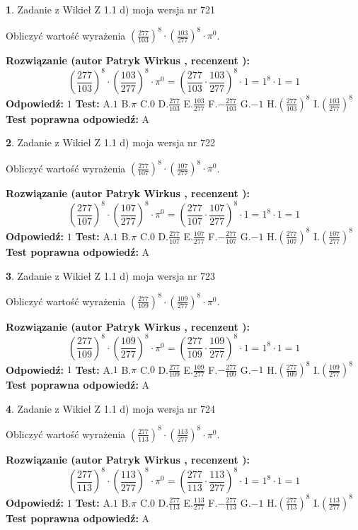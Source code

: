 \documentclass[12pt, a4paper]{article}
\theoremstyle{definition} %
\newtheorem{zad}{}
\newcommand{\zadStart}[1]{\begin{zad}#1\newline}
\newcommand{\zadStop}{\end{zad}}
\newcommand{\rozwStart}[2]{\noindent \textbf{Rozwiązanie (autor #1 , recenzent #2): }\newline}
\newcommand{\rozwStop}{\newline}
\newcommand{\odpStart}{\noindent \textbf{Odpowiedź:}\newline}
\newcommand{\odpStop}{\newline}
\newcommand{\testStart}{\noindent \textbf{Test:}\newline}
\newcommand{\testStop}{\newline}
\newcommand{\kluczStart}{\noindent \textbf{Test poprawna odpowiedź:}\newline}
\newcommand{\kluczStop}{\newline}
\begin{document}
\zadStart{Zadanie z Wikieł Z 1.1 d) moja wersja nr 721}

Obliczyć wartość wyrażenia $(\frac{277}{103})^{8} \cdot (\frac{103}{277})^{8} \cdot \pi^{0}$.
\zadStop
\rozwStart{Patryk Wirkus}{}
$$(\frac{277}{103})^{8} \cdot (\frac{103}{277})^{8} \cdot \pi^{0} = (\frac{277}{103} \cdot \frac{103}{277})^{8} \cdot 1 = 1^{8} \cdot 1 = 1$$
\rozwStop
\odpStart
$1$
\odpStop
\testStart
A.$1$ B.$\pi$ C.$0$ D.$\frac{277}{103}$ E.$\frac{103}{277}$
F.$-\frac{277}{103}$ G.$-1$
H.$(\frac{277}{103})^{8}$
I.$(\frac{103}{277})^{8}$
\testStop
\kluczStart
A
\kluczStop



\zadStart{Zadanie z Wikieł Z 1.1 d) moja wersja nr 722}

Obliczyć wartość wyrażenia $(\frac{277}{107})^{8} \cdot (\frac{107}{277})^{8} \cdot \pi^{0}$.
\zadStop
\rozwStart{Patryk Wirkus}{}
$$(\frac{277}{107})^{8} \cdot (\frac{107}{277})^{8} \cdot \pi^{0} = (\frac{277}{107} \cdot \frac{107}{277})^{8} \cdot 1 = 1^{8} \cdot 1 = 1$$
\rozwStop
\odpStart
$1$
\odpStop
\testStart
A.$1$ B.$\pi$ C.$0$ D.$\frac{277}{107}$ E.$\frac{107}{277}$
F.$-\frac{277}{107}$ G.$-1$
H.$(\frac{277}{107})^{8}$
I.$(\frac{107}{277})^{8}$
\testStop
\kluczStart
A
\kluczStop



\zadStart{Zadanie z Wikieł Z 1.1 d) moja wersja nr 723}

Obliczyć wartość wyrażenia $(\frac{277}{109})^{8} \cdot (\frac{109}{277})^{8} \cdot \pi^{0}$.
\zadStop
\rozwStart{Patryk Wirkus}{}
$$(\frac{277}{109})^{8} \cdot (\frac{109}{277})^{8} \cdot \pi^{0} = (\frac{277}{109} \cdot \frac{109}{277})^{8} \cdot 1 = 1^{8} \cdot 1 = 1$$
\rozwStop
\odpStart
$1$
\odpStop
\testStart
A.$1$ B.$\pi$ C.$0$ D.$\frac{277}{109}$ E.$\frac{109}{277}$
F.$-\frac{277}{109}$ G.$-1$
H.$(\frac{277}{109})^{8}$
I.$(\frac{109}{277})^{8}$
\testStop
\kluczStart
A
\kluczStop



\zadStart{Zadanie z Wikieł Z 1.1 d) moja wersja nr 724}

Obliczyć wartość wyrażenia $(\frac{277}{113})^{8} \cdot (\frac{113}{277})^{8} \cdot \pi^{0}$.
\zadStop
\rozwStart{Patryk Wirkus}{}
$$(\frac{277}{113})^{8} \cdot (\frac{113}{277})^{8} \cdot \pi^{0} = (\frac{277}{113} \cdot \frac{113}{277})^{8} \cdot 1 = 1^{8} \cdot 1 = 1$$
\rozwStop
\odpStart
$1$
\odpStop
\testStart
A.$1$ B.$\pi$ C.$0$ D.$\frac{277}{113}$ E.$\frac{113}{277}$
F.$-\frac{277}{113}$ G.$-1$
H.$(\frac{277}{113})^{8}$
I.$(\frac{113}{277})^{8}$
\testStop
\kluczStart
A
\kluczStop
\end{document}

